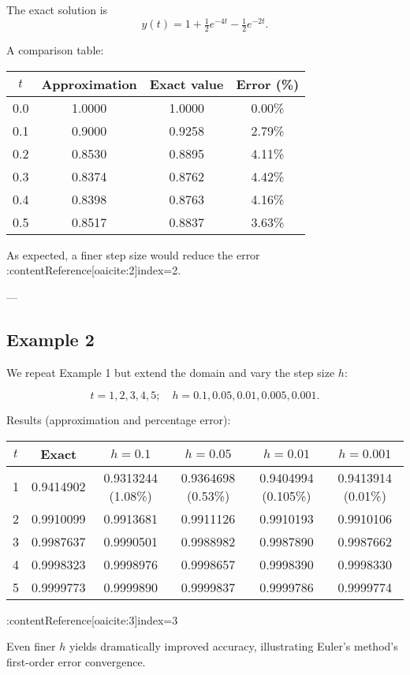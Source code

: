 \documentclass[12pt]{book}
\begin{document}
The exact solution is
\[
y(t) = 1 + \tfrac12 e^{-4t} - \tfrac12 e^{-2t}.
\]

A comparison table:

\begin{tabular}{cccc}
\hline
 \(t\) & Approximation & Exact value & Error (\%) \\
\hline
0.0 & 1.0000 & 1.0000 & 0.00\% \\
0.1 & 0.9000 & 0.9258 & 2.79\% \\
0.2 & 0.8530 & 0.8895 & 4.11\% \\
0.3 & 0.8374 & 0.8762 & 4.42\% \\
0.4 & 0.8398 & 0.8763 & 4.16\% \\
0.5 & 0.8517 & 0.8837 & 3.63\% \\
\hline
\end{tabular}

As expected, a finer step size would reduce the error :contentReference[oaicite:2]{index=2}.

---

\subsection*{Example 2}

We repeat Example 1 but extend the domain and vary the step size \(h\):

\[
t = 1, 2, 3, 4, 5; \quad h = 0.1, 0.05, 0.01, 0.005, 0.001.
\]

Results (approximation and percentage error):

\begin{tabular}{cccccc}
\hline
\(t\) & Exact & \(h=0.1\) & \(h=0.05\) & \(h=0.01\) & \(h=0.001\) \\
\hline
1 & 0.9414902 & 0.9313244 (1.08\%) & 0.9364698 (0.53\%) & 0.9404994 (0.105\%) & 0.9413914 (0.01\%) \\
2 & 0.9910099 & 0.9913681 & 0.9911126 & 0.9910193 & 0.9910106 \\
3 & 0.9987637 & 0.9990501 & 0.9988982 & 0.9987890 & 0.9987662 \\
4 & 0.9998323 & 0.9998976 & 0.9998657 & 0.9998390 & 0.9998330 \\
5 & 0.9999773 & 0.9999890 & 0.9999837 & 0.9999786 & 0.9999774 \\
\hline
\end{tabular} :contentReference[oaicite:3]{index=3}

Even finer $h$ yields dramatically improved accuracy, illustrating Euler's method's first-order error convergence.
\end{document}

